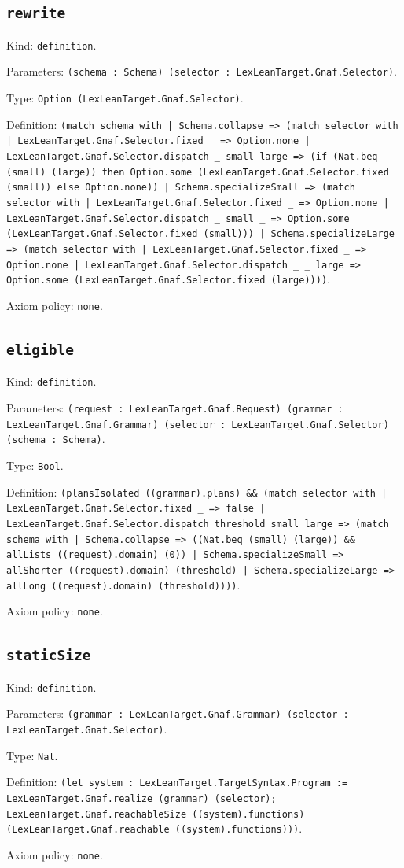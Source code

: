 \documentclass[11pt]{article}
\begin{document}
\subsection*{\texttt{rewrite}}
\noindent Kind: \texttt{definition}.\par
\noindent Parameters: \texttt{(schema : Schema) (selector : LexLeanTarget.Gnaf.Selector)}.\par
\noindent Type: \texttt{Option (LexLeanTarget.Gnaf.Selector)}.\par
\noindent Definition: \texttt{(match schema with | Schema.collapse => (match selector with | LexLeanTarget.Gnaf.Selector.fixed \_ => Option.none | LexLeanTarget.Gnaf.Selector.dispatch \_ small large => (if (Nat.beq (small) (large)) then Option.some (LexLeanTarget.Gnaf.Selector.fixed (small)) else Option.none)) | Schema.specializeSmall => (match selector with | LexLeanTarget.Gnaf.Selector.fixed \_ => Option.none | LexLeanTarget.Gnaf.Selector.dispatch \_ small \_ => Option.some (LexLeanTarget.Gnaf.Selector.fixed (small))) | Schema.specializeLarge => (match selector with | LexLeanTarget.Gnaf.Selector.fixed \_ => Option.none | LexLeanTarget.Gnaf.Selector.dispatch \_ \_ large => Option.some (LexLeanTarget.Gnaf.Selector.fixed (large))))}.\par
\noindent Axiom policy: \texttt{none}.\par
\subsection*{\texttt{eligible}}
\noindent Kind: \texttt{definition}.\par
\noindent Parameters: \texttt{(request : LexLeanTarget.Gnaf.Request) (grammar : LexLeanTarget.Gnaf.Grammar) (selector : LexLeanTarget.Gnaf.Selector) (schema : Schema)}.\par
\noindent Type: \texttt{Bool}.\par
\noindent Definition: \texttt{(plansIsolated ((grammar).plans) \&\& (match selector with | LexLeanTarget.Gnaf.Selector.fixed \_ => false | LexLeanTarget.Gnaf.Selector.dispatch threshold small large => (match schema with | Schema.collapse => ((Nat.beq (small) (large)) \&\& allLists ((request).domain) (0)) | Schema.specializeSmall => allShorter ((request).domain) (threshold) | Schema.specializeLarge => allLong ((request).domain) (threshold))))}.\par
\noindent Axiom policy: \texttt{none}.\par
\subsection*{\texttt{staticSize}}
\noindent Kind: \texttt{definition}.\par
\noindent Parameters: \texttt{(grammar : LexLeanTarget.Gnaf.Grammar) (selector : LexLeanTarget.Gnaf.Selector)}.\par
\noindent Type: \texttt{Nat}.\par
\noindent Definition: \texttt{(let system : LexLeanTarget.TargetSyntax.Program := LexLeanTarget.Gnaf.realize (grammar) (selector); LexLeanTarget.Gnaf.reachableSize ((system).functions) (LexLeanTarget.Gnaf.reachable ((system).functions)))}.\par
\noindent Axiom policy: \texttt{none}.\par
\end{document}
